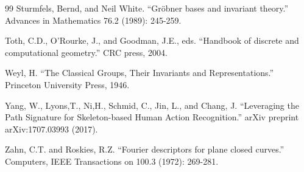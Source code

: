 \documentclass{scrartcl}
\theoremstyle{plain}
\theoremstyle{definition}
\newcommand{\1}[1]{1_{\{#1\}}}
\begin{document}
\begin{thebibliography}{99}
    Sturmfels, Bernd, and Neil White. ``Gr\"obner bases and invariant theory.'' Advances in Mathematics 76.2 (1989): 245-259.

    Toth, C.D., O'Rourke, J., and Goodman, J.E., eds. ``Handbook of discrete and computational geometry.'' CRC press, 2004.

    Weyl, H. ``The Classical Groups, Their Invariants and Representations.'' Princeton University Press, 1946.

    Yang, W., Lyons,T., Ni,H., Schmid, C., Jin, L., and Chang, J.
    ``Leveraging the Path Signature for Skeleton-based Human Action Recognition.''
    arXiv preprint arXiv:1707.03993 (2017).

    Zahn, C.T. and Roskies, R.Z. ``Fourier descriptors for plane closed curves.'' Computers, IEEE Transactions on 100.3 (1972): 269-281.




\end{thebibliography}
\end{document}
